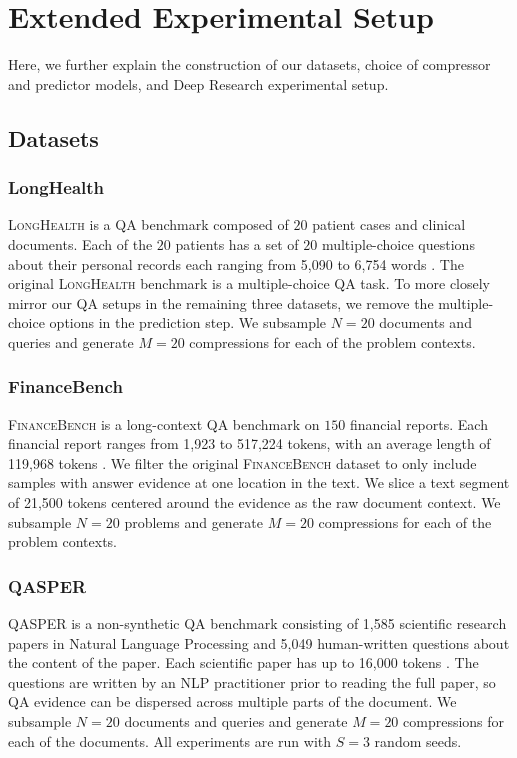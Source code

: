 \documentclass{article} %
\begin{document}
\section{Extended Experimental Setup}
\label{sec:appendix-exp-setup}

Here, we further explain the construction of our datasets, choice of compressor and predictor models, and Deep Research experimental setup.

\subsection{Datasets}
\label{sec:appendix-dataset}

\subsubsection{LongHealth}
\label{sec:appendix-longhealth} 
\textsc{LongHealth} is a QA benchmark composed of $20$ patient cases and clinical documents. Each of the $20$ patients has a set of $20$ multiple-choice questions about their personal records each ranging from 5{,}090 to 6{,}754 words \citep{adams2024longhealth}. The original \textsc{LongHealth} benchmark is a multiple-choice QA task. To more closely mirror our QA setups in the remaining three datasets, we remove the multiple-choice options in the prediction step. We subsample $N=20$ documents and queries and generate $M=20$ compressions for each of the problem contexts.

\subsubsection{FinanceBench}
\label{sec:appendix-financebench}
\textsc{FinanceBench} is a long-context QA benchmark on $150$ financial reports. Each financial report ranges from 1{,}923 to 517{,}224 tokens, with an average length of 119{,}968 tokens \citep{islam2023financebench}. We filter the original \textsc{FinanceBench} dataset to only include samples with answer evidence at one location in the text. We slice a text segment of 21{,}500 tokens centered around the evidence as the raw document context. We subsample $N=20$ problems and generate $M=20$ compressions for each of the problem contexts.

\subsubsection{QASPER}
\label{sec:appendix-qasper}
\textsc{QASPER} is a non-synthetic QA benchmark consisting of 1{,}585 scientific research papers in Natural Language Processing and 5{,}049 human-written questions about the content of the paper. Each scientific paper has up to 16{,}000 tokens \citep{qasper}. The questions are written by an NLP practitioner prior to reading the full paper, so QA evidence can be dispersed across multiple parts of the document. We subsample $N=20$ documents and queries and generate $M=20$ compressions for each of the documents. All experiments are run with $S=3$ random seeds.
\end{document}
